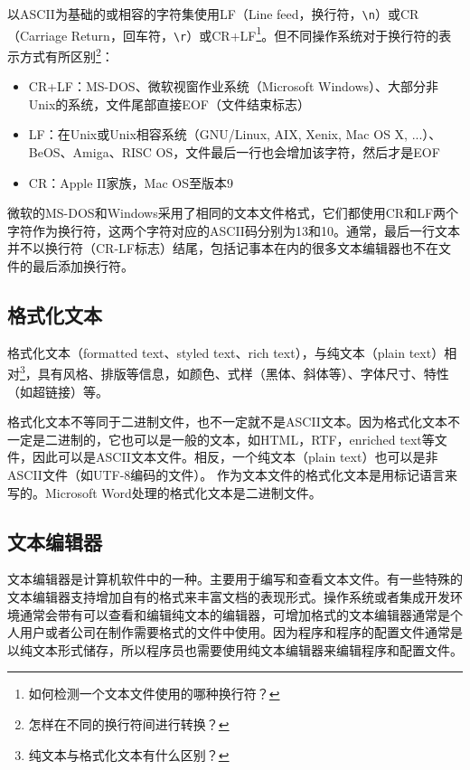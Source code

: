 \documentclass[11pt,a4paper,twoside]{book}
\begin{document}
以ASCII为基础的或相容的字符集使用LF（Line feed，换行符，\verb|\n|）或CR（Carriage Return，回车符，\verb|\r|）或CR+LF\footnote{如何检测一个文本文件使用的哪种换行符？}。但不同操作系统对于换行符的表示方式有所区别\footnote{怎样在不同的换行符间进行转换？}：
\begin{itemize}
  \item CR+LF：MS-DOS、微软视窗作业系统（Microsoft Windows）、大部分非Unix的系统，文件尾部直接EOF（文件结束标志）
  \item LF：在Unix或Unix相容系统（GNU/Linux, AIX, Xenix, Mac OS X, ...）、BeOS、Amiga、RISC OS，文件最后一行也会增加该字符，然后才是EOF
  \item CR：Apple II家族，Mac OS至版本9
\end{itemize}

微软的MS-DOS和Windows采用了相同的文本文件格式，它们都使用CR和LF两个字符作为换行符，这两个字符对应的ASCII码分别为13和10。通常，最后一行文本并不以换行符（CR-LF标志）结尾，包括记事本在内的很多文本编辑器也不在文件的最后添加换行符。

\subsection{格式化文本}
格式化文本（formatted text、styled text、rich text），与纯文本（plain text）相对\footnote{纯文本与格式化文本有什么区别？}，具有风格、排版等信息，如颜色、式样（黑体、斜体等）、字体尺寸、特性（如超链接）等。

格式化文本不等同于二进制文件，也不一定就不是ASCII文本。因为格式化文本不一定是二进制的，它也可以是一般的文本，如HTML，RTF，enriched text等文件，因此可以是ASCII文本文件。相反，一个纯文本（plain text）也可以是非ASCII文件（如UTF-8编码的文件）。 作为文本文件的格式化文本是用标记语言来写的。Microsoft Word处理的格式化文本是二进制文件。

\subsection{文本编辑器}
文本编辑器是计算机软件中的一种。主要用于编写和查看文本文件。有一些特殊的文本编辑器支持增加自有的格式来丰富文档的表现形式。操作系统或者集成开发环境通常会带有可以查看和编辑纯文本的编辑器，可增加格式的文本编辑器通常是个人用户或者公司在制作需要格式的文件中使用。因为程序和程序的配置文件通常是以纯文本形式储存，所以程序员也需要使用纯文本编辑器来编辑程序和配置文件。
\end{document}
